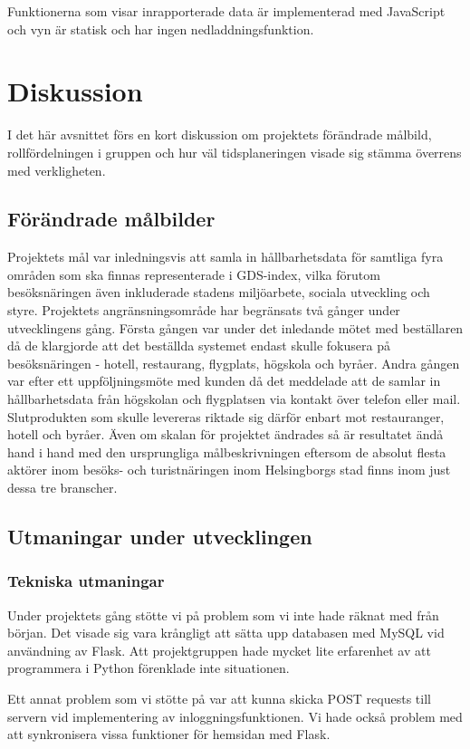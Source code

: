 \documentclass[12pt]{article}
\begin{document}
Funktionerna som visar inrapporterade data är implementerad med JavaScript och vyn är statisk och har ingen nedladdningsfunktion.

\section{Diskussion}
I det här avsnittet förs en kort diskussion om projektets förändrade målbild, rollfördelningen i gruppen och hur väl tidsplaneringen visade sig stämma överrens med verkligheten.
\subsection{Förändrade målbilder}

Projektets mål var inledningsvis att samla in hållbarhetsdata för samtliga fyra områden som ska finnas representerade i GDS-index, vilka förutom besöksnäringen även inkluderade stadens miljöarbete, sociala utveckling och styre. Projektets angränsningsområde har begränsats två gånger under utvecklingens gång. Första gången var under det inledande mötet med beställaren då de klargjorde att det beställda systemet endast skulle fokusera på besöksnäringen - hotell, restaurang, flygplats, högskola och byråer. Andra gången var efter ett uppföljningsmöte med kunden då det meddelade att de samlar in hållbarhetsdata från högskolan och flygplatsen via kontakt över telefon eller mail. Slutprodukten som skulle levereras riktade sig därför enbart mot restauranger, hotell och byråer. Även om skalan för projektet ändrades så är resultatet ändå hand i hand med den ursprungliga målbeskrivningen eftersom de absolut flesta aktörer inom besöks- och turistnäringen inom Helsingborgs stad finns inom just dessa tre branscher.


\subsection{Utmaningar under utvecklingen}

\subsubsection{Tekniska utmaningar}
Under projektets gång stötte vi på problem som vi inte hade räknat med från början. Det visade sig vara krångligt att sätta upp databasen med MySQL vid användning av Flask. Att projektgruppen hade mycket lite erfarenhet av att programmera i Python förenklade inte situationen.  

Ett annat problem som vi stötte på var att kunna skicka POST requests till servern vid implementering av inloggningsfunktionen. Vi hade också problem med att synkronisera vissa funktioner för hemsidan med Flask.
\end{document}
